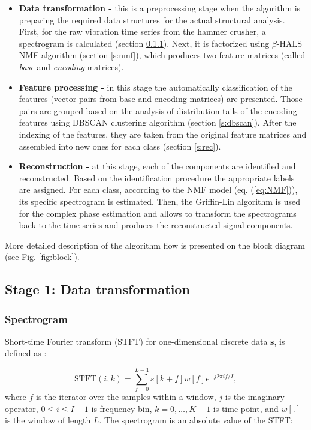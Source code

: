 \documentclass[3p,times]{elsarticle}
\begin{document}
\begin{itemize}
 \item \textbf{Data transformation -} this is a preprocessing stage when the algorithm is preparing the required data structures for the actual structural
 analysis. First, for the raw vibration time series from the hammer crusher, a spectrogram is calculated (section \ref{s:sec_spec}). Next, it is factorized using $\beta$-HALS NMF algorithm (section \ref{s:nmf}), which produces two feature matrices (called \emph{base} and \emph{encoding} matrices).
 
 \item \textbf{Feature processing -} in this stage the automatically classification of the features (vector pairs from base and encoding matrices) are presented. Those pairs are grouped based on the analysis of distribution tails of the encoding features using DBSCAN clustering algorithm (section \ref{s:dbscan}). After the indexing of the features, they are taken from the original feature matrices and assembled into new ones for each class (section \ref{s:rec}).

 \item \textbf{Reconstruction -} at this stage, each of the components are identified and reconstructed. Based on the identification procedure the appropriate labels are assigned. For each class, according to the NMF model (eq. (\ref{eq:NMF})), its specific spectrogram is estimated. Then, the Griffin-Lin algorithm is used for the complex phase estimation and allows to transform the spectrograms back to the time series and produces the reconstructed signal components.
\end{itemize}

More detailed description of the algorithm flow is presented on the block diagram (see Fig. \ref{fig:block}).



\subsection{Stage 1: Data transformation}

\subsubsection{Spectrogram}\label{s:sec_spec}

Short-time Fourier transform (STFT) for one-dimensional discrete data $\mathbf{s}$, is defined as \cite{allen1977short}:

\begin{equation}
 \textrm{STFT}(i,k)=\sum_{f=0}^{L-1}s[k+f]w[f]e^{-j2\pi if/I},
\end{equation}
where $f$ is the iterator over the samples within a window, $j$ is the imaginary operator, $0\leq i \leq I-1$ is frequency bin, $k=0,\dots,K-1$ is time point, and $w[.]$ is the window of length $L$. The spectrogram is an absolute value of the STFT:
\end{document}
